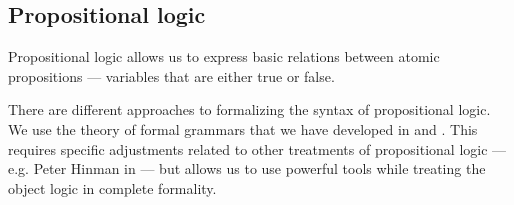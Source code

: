 \subsection{Propositional logic}\label{subsec:propositional_logic}

Propositional logic allows us to express basic relations between atomic propositions --- variables that are either true or false.

\begin{remark}\label{rem:propositional_syntax_and_grammars}
  There are different approaches to formalizing the syntax of propositional logic. We use the theory of formal grammars that we have developed in  and . This requires specific adjustments related to other treatments of propositional logic --- e.g. Peter Hinman in  --- but allows us to use powerful tools while treating the object logic in complete formality.
\end{remark}

